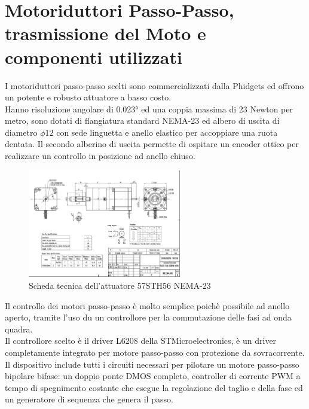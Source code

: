 \documentclass[%
corpo=11pt,
twoside,
 stile=classica,
oldstyle,
greek,%
]{toptesi}
\begin{document}
	\section{Motoriduttori Passo-Passo, trasmissione del Moto e componenti utilizzati}
	I motoriduttori passo-passo scelti sono commercializzati dalla Phidgets ed offrono un potente e robusto attuatore a basso costo. \\
	Hanno risoluzione angolare di 0.023° ed una coppia massima di 23 Newton per metro, sono dotati di flangiatura standard NEMA-23 ed albero di uscita di diametro $\phi 12$ con sede linguetta e anello elastico per accoppiare una ruota dentata. 
	Il secondo alberino di uscita permette di ospitare un encoder ottico per realizzare un controllo in posizione ad anello chiuso.\\
		\begin{figure}
		\centering
		\includegraphics[width=0.6\textwidth]{Screen/STEPPER.png}
		\caption{Scheda tecnica dell'attuatore 57STH56 NEMA-23}
		\label{fig:Stepper}
	\end{figure}
	Il controllo dei motori passo-passo è molto semplice poichè possibile ad anello aperto, tramite l'uso du un controllore per la commutazione delle fasi ad onda quadra. \\
	Il controllore scelto è il driver L6208 della STMicroelectronics, è un driver completamente integrato per motore passo-passo con protezione da sovracorrente. Il dispositivo include tutti i circuiti necessari per pilotare un motore passo-passo bipolare bifase: un doppio ponte DMOS completo, controller di corrente PWM a tempo di spegnimento costante che esegue la regolazione del taglio e della fase ed un generatore di sequenza che genera il passo. \\
	
\end{document}
